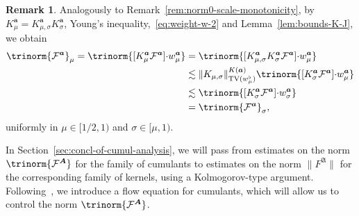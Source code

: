 \documentclass{article}
\numberwithin{equation}{section}
\theoremstyle{plain}
\theoremstyle{definition}
\newtheorem{remark}[theorem]{Remark}
\begin{document}
\begin{remark}
  \label{rem:norm-scale-monotonicity}Analogously to
  Remark~\ref{rem:norm0-scale-monotonicity}, by $K^{\boldsymbol{a}}_{\mu} =
  K^{\boldsymbol{a}}_{\mu, \sigma} K_{\sigma}^{\boldsymbol{a}}$, Young's
  inequality,~\eqref{eq:weight-w-2} and Lemma~\ref{lem:bounds-K-J}, we obtain
  \begin{align*}
    \trinorm{ \mathcal{F}^{\boldsymbol{a}} }_{\mu} =
    \trinorm{ [K^{\boldsymbol{a}}_{\mu} \mathcal{F}^{\boldsymbol{a}}]
    {\cdot w^{\boldsymbol{a}}_{\mu}}  } &=  \trinorm{
    [K^{\boldsymbol{a}}_{\mu,\sigma} K^{\boldsymbol{a}}_{\sigma}
    \mathcal{F}^{\boldsymbol{a}}] {\cdot w^{\boldsymbol{a}}_{\mu}} 
    }\\
 &\lesssim  \|
    K_{\mu, \sigma} \|_{\operatorname{TV} (w^{\flat}_{\mu})}^{K (\boldsymbol{a})} 
    \trinorm{ [K^{\boldsymbol{a}}_{\sigma} \mathcal{F}^{\boldsymbol{a}}]
    {\cdot w^{\boldsymbol{a}}_{\mu}}  }\\
 &\lesssim  \trinorm{ [K^{\boldsymbol{a}}_{\sigma}
    \mathcal{F}^{\boldsymbol{a}}] {\cdot w^{\boldsymbol{a}}_{\sigma}} 
    }\\
 &=  \trinorm{ \mathcal{F}^{\boldsymbol{a}} }_{\sigma},
  \end{align*}
  uniformly in $\mu \in [1 / 2, 1)$ and $\sigma \in [\mu, 1)$.
\end{remark}

In Section~\ref{sec:concl-of-cumul-analysis}, we will pass from estimates on the
norm $\trinorm{ \mathcal{F}^{\boldsymbol{A}} }$ for the family of
cumulants to estimates on the norm $\| F^{\mathfrak{A}} \|$ for the
corresponding family of kernels, using a Kolmogorov-type argument.
Following~{\cite{duchFlowEquationApproach2021,duchRenormalizationSingularElliptic2022}},
we introduce a flow equation for cumulants, which will allow us to control the
norm $\trinorm{ \mathcal{F}^{\boldsymbol{A}} }$.
\end{document}
